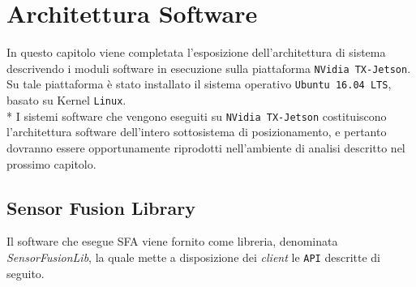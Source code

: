\chapter{Architettura Software}
In questo capitolo viene completata l'esposizione dell'architettura di sistema descrivendo i moduli software in esecuzione sulla piattaforma \texttt{NVidia TX-Jetson}. Su tale piattaforma  \`e stato installato il sistema operativo \texttt{Ubuntu 16.04 LTS}, basato su Kernel \texttt{Linux}.\\*
I sistemi software che vengono eseguiti su \texttt{NVidia TX-Jetson} costituiscono l'architettura software dell'intero sottosistema di posizionamento, e pertanto dovranno essere opportunamente riprodotti nell'ambiente di analisi descritto nel prossimo capitolo.
\section{Sensor Fusion Library}
Il software che esegue SFA viene fornito come libreria, denominata \textit{SensorFusionLib}, la quale mette a disposizione dei \emph{client} le \texttt{API} descritte di seguito.

